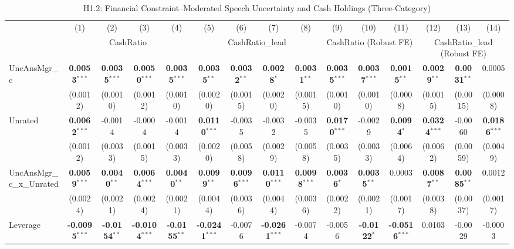 \begin{landscape}
\begin{table}[H]
\setlength{\tabcolsep}{3pt}
\renewcommand{\arraystretch}{0.85}
\centering
\caption{H1.2: Financial Constraint--Moderated Speech Uncertainty and Cash Holdings (Three-Category)}
\label{tab:h1_2}
\scriptsize
\begin{tabular}{lcccccccccccccc}
\toprule
 & (1) & (2) & (3) & (4) & (5) & (6) & (7) & (8) & (9) & (10) & (11) & (12) & (13) & (14) \\
 & \multicolumn{4}{c}{CashRatio} & \multicolumn{4}{c}{CashRatio\_lead} & \multicolumn{3}{c}{CashRatio (Robust FE)} & \multicolumn{3}{c}{CashRatio\_lead (Robust FE)} \\
\cmidrule(lr){2-5} \cmidrule(lr){6-9} \cmidrule(lr){10-12} \cmidrule(lr){13-15}
\midrule
UncAnsMgr\_c & \textbf{0.0053}$^{***}$ & \textbf{0.0035}$^{***}$ & \textbf{0.0050}$^{***}$ & \textbf{0.0035}$^{***}$ & \textbf{0.0035}$^{**}$ & \textbf{0.0032}$^{**}$ & \textbf{0.0028}$^{*}$ & \textbf{0.0031}$^{**}$ & \textbf{0.0035}$^{***}$ & \textbf{0.0037}$^{***}$ & \textbf{0.0015}$^{**}$ & \textbf{0.0029}$^{**}$ & \textbf{0.0031}$^{**}$ & 0.0005 \\
 & (0.0012) & (0.0010) & (0.0012) & (0.0010) & (0.0020) & (0.0015) & (0.0020) & (0.0015) & (0.0010) & (0.0010) & (0.0008) & (0.0015) & (0.0015) & (0.0008) \\
Unrated & \textbf{0.0062}$^{***}$ & -0.0014 & -0.0004 & -0.0014 & \textbf{0.0110}$^{***}$ & -0.0035 & -0.0032 & -0.0035 & \textbf{0.0170}$^{***}$ & -0.0029 & \textbf{0.0094}$^{*}$ & \textbf{0.0324}$^{***}$ & -0.0060 & \textbf{0.0186}$^{***}$ \\
 & (0.0012) & (0.0033) & (0.0015) & (0.0033) & (0.0020) & (0.0058) & (0.0029) & (0.0058) & (0.0035) & (0.0033) & (0.0064) & (0.0062) & (0.0059) & (0.0049) \\
UncAnsMgr\_c\_x\_Unrated & \textbf{0.0059}$^{***}$ & \textbf{0.0040}$^{**}$ & \textbf{0.0064}$^{***}$ & \textbf{0.0040}$^{**}$ & \textbf{0.0099}$^{**}$ & \textbf{0.0096}$^{***}$ & \textbf{0.0110}$^{***}$ & \textbf{0.0098}$^{***}$ & \textbf{0.0036}$^{*}$ & \textbf{0.0035}$^{**}$ & 0.0003 & \textbf{0.0087}$^{**}$ & \textbf{0.0085}$^{**}$ & 0.0012 \\
 & (0.0024) & (0.0021) & (0.0024) & (0.0021) & (0.0044) & (0.0036) & (0.0044) & (0.0036) & (0.0022) & (0.0021) & (0.0017) & (0.0038) & (0.0037) & (0.0017) \\
\midrule
Leverage & \textbf{-0.0095}$^{***}$ & \textbf{-0.0154}$^{**}$ & \textbf{-0.0104}$^{***}$ & \textbf{-0.0155}$^{**}$ & \textbf{-0.0241}$^{***}$ & -0.0076 & \textbf{-0.0261}$^{***}$ & -0.0074 & -0.0056 & \textbf{-0.0122}$^{*}$ & \textbf{-0.0516}$^{***}$ & 0.0103 & -0.0029 & -0.0003 \\

\end{tabular}
\end{table}
\end{landscape}
